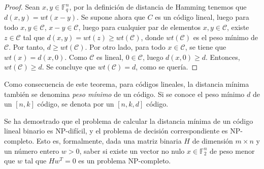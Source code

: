 \begin{proof}
    Sean $x,y \in \mathbb{F}_q^n$, por la definición de distancia de Hamming tenemos que $d(x,y) = wt(x-y)$. Se supone ahora que $C$ es un código lineal, luego para todo $x,y \in \mathcal{C}$, $x-y \in \mathcal{C}$, luego para cualquier par de elementos $x,y \in \mathcal{C}$, existe $z \in \mathcal{C}$ tal que $d(x,y) = wt(z) \geq wt(\mathcal{C})$, donde $wt(\mathcal{C})$ es el peso mínimo de $\mathcal{C}$. Por tanto, $d \geq wt(\mathcal{C})$. Por otro lado, para todo $x \in \mathcal{C}$, se tiene que $wt(x) = d(x,0)$. Como $\mathcal{C}$ es lineal, $0 \in \mathcal{C}$, luego $d(x,0) \geq d$. Entonces, $wt(\mathcal{C}) \geq d$. Se concluye que $wt(\mathcal{C}) = d$, como se quería.
\end{proof}

Como consecuencia de este teorema, para códigos lineales, la distancia mínima también se denomina \emph{peso mínimo} de un código. Si se conoce el peso mínimo $d$ de un $[n,k]$ código, se denota por un $[n,k,d]$ código.

Se ha demostrado que el problema de calcular la distancia mínima de un código lineal binario es NP-difícil, y el problema de decisión correspondiente es NP-completo. Esto es, formalmente, dada una matriz binaria $H$ de dimensión $m \times n$ y un número entero $w > 0$, saber si existe un vector no nulo $x \in \mathbb{F}_2^n$ de peso menor que $w$ tal que $Hw^T = 0$ es un problema NP-completo. 

